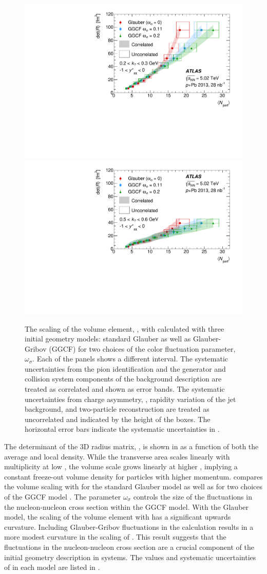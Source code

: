\begin{figure}[t]
\centering
\includegraphics[width=0.49\linewidth]{canqosl_detR_kt1_ggcf.pdf}
\includegraphics[width=0.49\linewidth]{canqosl_detR_kt4_ggcf.pdf}\\
\caption{The scaling of the volume element, \detR, with \avgNpart calculated with three initial geometry models: standard Glauber as well as Glauber-Gribov (GGCF) for two choices of the color fluctuation parameter, $\omega_\sigma$.
Each of the panels shows a different \kt interval.
The systematic uncertainties from the pion identification and the generator and collision system components of the background description are treated as correlated and shown as error bands.
The systematic uncertainties from charge asymmetry, \Reff, rapidity variation of the jet background, and two-particle reconstruction are treated as uncorrelated and indicated by the height of the boxes.
The horizontal error bars indicate the systematic uncertainties in \avgNpart.}
\label{fig:results_detR_ggcf}
\end{figure}

The determinant of the 3D radius matrix, \detR, is shown in  as a function of both the average and local density.
While the transverse area scales linearly with  multiplicity at low \kt, the volume scale grows linearly at higher \kt, implying a constant freeze-out volume density for particles with higher momentum.
 compares the volume scaling with \avgNpart for the standard Glauber model as well as for two choices of the \ac{GGCF} model \cite{Alvioli:2013vk}.
The parameter $\omega_{\sigma}$ controls the size of the fluctuations in the nucleon-nucleon cross section within the \ac{GGCF} model.
With the Glauber model, the scaling of the volume element with \avgNpart has a significant upwards curvature.
Including Glauber-Gribov fluctuations in the \avgNpart calculation results in a more modest curvature in the scaling of \detR.
This result suggests that the fluctuations in the nucleon-nucleon cross section are a crucial component of the initial geometry description in \pPb systems.
The values and systematic uncertainties of \avgNpart in each model are listed in .

